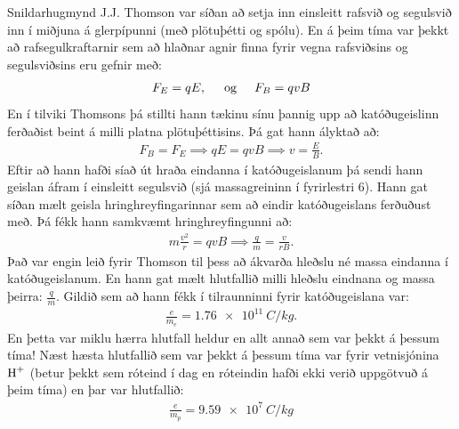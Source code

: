 Snildarhugmynd J.J. Thomson var síðan að setja inn einsleitt rafsvið og segulsvið inn í miðjuna á glerpípunni (með plötuþétti og spólu). En á þeim tíma var þekkt að rafsegulkraftarnir sem að hlaðnar agnir finna fyrir vegna rafsviðsins og segulsviðsins eru gefnir með:
\begin{align*}
    F_E = qE, \hspace{0.5cm} \text{og} \hspace{0.5cm} F_B = qvB
\end{align*}
En í tilviki Thomsons þá stillti hann tækinu sínu þannig upp að katóðugeislinn ferðaðist beint á milli platna plötuþéttisins. Þá gat hann ályktað að:
\begin{align*}
    F_B = F_E \implies qE = qvB \implies v = \frac{E}{B}.
\end{align*}
Eftir að hann hafði síað út hraða eindanna í katóðugeislanum þá sendi hann geislan áfram í einsleitt segulsvið (sjá massagreininn í fyrirlestri 6). Hann gat síðan mælt geisla hringhreyfingarinnar sem að eindir katóðugeislans ferðuðust með. Þá fékk hann samkvæmt hringhreyfingunni að:
\begin{align*}
    m\frac{v^2}{r} = qvB \implies \frac{q}{m} = \frac{v}{rB}.
\end{align*}
Það var engin leið fyrir Thomson til þess að ákvarða hleðslu né massa eindanna í katóðugeislanum. En hann gat mælt hlutfallið milli hleðslu eindnana og massa þeirra: $\frac{q}{m}$. Gildið sem að hann fékk í tilraunninni fyrir katóðugeislana var:
\begin{align*}
    \frac{e}{m_e} = \SI{1.76e11}{C/kg}.
\end{align*}
En þetta var miklu hærra hlutfall heldur en allt annað sem var þekkt á þessum tíma! Næst hæsta hlutfallið sem var þekkt á þessum tíma var fyrir vetnisjónina $\ce{H+}$ (betur þekkt sem róteind í dag en róteindin hafði ekki verið uppgötvuð á þeim tíma) en þar var hlutfallið:
\begin{align*}
    \frac{e}{m_p} = \SI{9.59e7}{C/kg}
\end{align*}
